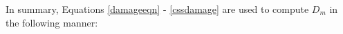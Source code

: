 


In summary, Equations \ref{damageeqn} - \ref{cssdamage} are used to compute $D_m$ in the following manner:

